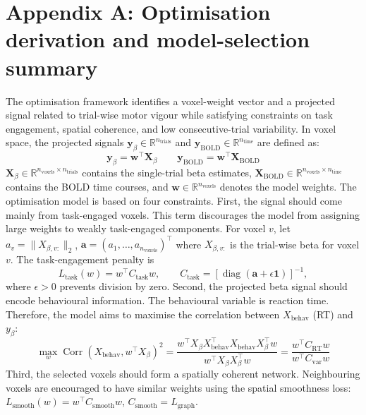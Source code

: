 \documentclass[utf8]{FrontiersinHarvard}
\begin{document}
\clearpage

\section*{Appendix A: Optimisation derivation and model-selection summary}
The optimisation framework identifies a voxel-weight vector and a projected signal related to trial-wise motor vigour while satisfying constraints on task engagement, spatial coherence, and low consecutive-trial variability. In voxel space, the projected signals \( \mathbf{y}_{\beta} \in \mathbb{R}^{n_{\mathrm{trials}}} \) and \( \mathbf{y}_{\mathrm{BOLD}} \in \mathbb{R}^{n_{\mathrm{time}}} \) are defined as:
\begin{equation*}\mathbf{y}_{\beta} = \mathbf{w}^{\top}\mathbf{X}_{\beta} \qquad \mathbf{y}_{\mathrm{BOLD}} = \mathbf{w}^{\top}\mathbf{X}_{\mathrm{BOLD}}\end{equation*}
\( \mathbf{X}_{\beta} \in \mathbb{R}^{n_{\mathrm{voxels}} \times n_{\mathrm{trials}}} \) contains the single-trial beta estimates, \( \mathbf{X}_{\mathrm{BOLD}} \in \mathbb{R}^{n_{\mathrm{voxels}} \times n_{\mathrm{time}}} \) contains the BOLD time courses, and \( \mathbf{w} \in \mathbb{R}^{n_{\mathrm{voxels}}} \) denotes the model weights. The optimisation model is based on four constraints. First, the signal should come mainly from task-engaged voxels. This term discourages the model from assigning large weights to weakly task-engaged components. For voxel \(v\), let \(a_v=\|X_{\beta,v:}\|_2\), \(\mathbf{a}=(a_1,\ldots, a_{n_{\mathrm{voxels}}})^\top \)
where \(X_{\beta,v:}\) is the trial-wise beta for voxel \(v\). The task-engagement penalty is
\[
L_{\mathrm{task}}(w)=w^\top C_{\mathrm{task}}w,\qquad
C_{\mathrm{task}}=
\left[\operatorname{diag}(\mathbf{a}+\epsilon\mathbf{1})\right]^{-1},
\]
where \(\epsilon>0\) prevents division by zero.
Second, the projected beta signal should encode behavioural information. The behavioural variable is reaction time. Therefore, the model aims to maximise the correlation between \(X_{\mathrm{behav}}\) (RT) and \(y_{\beta}\):
\begin{equation*}
\max_w
\operatorname{Corr}\!\left(X_{\mathrm{behav}}, w^\top X_{\beta}\right)^2
=
\frac{w^\top X_{\beta}X_{\mathrm{behav}}^\top X_{\mathrm{behav}}X_{\beta}^\top w}{w^\top X_{\beta}X_{\beta}^\top  w}
=
\frac{w^\top C_{\mathrm{RT}} w}{w^\top C_{\mathrm{var}} w}
\end{equation*}
Third, the selected voxels should form a spatially coherent network. Neighbouring voxels are encouraged to have similar weights using the spatial smoothness loss: \(L_{\mathrm{smooth}}(w) = w^\top C_{\mathrm{smooth}}w\), \(C_{\mathrm{smooth}} = L_{\mathrm{graph}}\).
\end{document}
